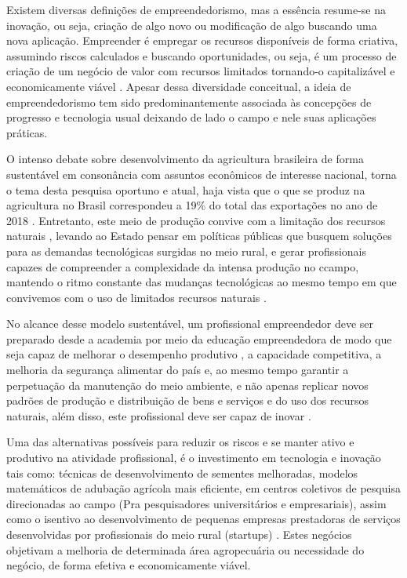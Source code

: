 Existem diversas definições de empreendedorismo, mas a essência resume-se na inovação, ou seja, criação de algo novo ou modificação de algo buscando uma nova aplicação. Empreender é empregar os recursos disponíveis de forma criativa, assumindo riscos calculados e buscando oportunidades, ou seja, é um processo de criação de um negócio de valor com recursos limitados tornando-o capitalizável e economicamente viável  \cite{costa_empreendedorismo_2006, stevenson_new_1989, lopes_educacao_2010}. Apesar dessa diversidade conceitual, a ideia de empreendedorismo tem sido predominantemente associada às concepções de progresso e tecnologia usual deixando de lado o campo e nele suas aplicações práticas.  

O intenso debate sobre desenvolvimento da agricultura brasileira de forma sustentável em consonância com assuntos econômicos de interesse nacional, torna o tema desta pesquisa oportuno e atual, haja vista que o que se produz na agricultura no Brasil correspondeu a 19\% do total das exportações no ano de 2018 \cite{mdic_comex_2019}. Entretanto, este meio de produção convive com a limitação dos recursos naturais \cite{jacobi_meio_1999}, levando ao Estado pensar em políticas públicas que busquem soluções para as demandas tecnológicas surgidas no meio rural, e gerar profissionais capazes de compreender a complexidade da intensa produção no ccampo, mantendo o ritmo constante das mudanças tecnológicas ao mesmo tempo em que convivemos com o uso de limitados recursos naturais  \cite{costa_dinamica_2016}.

No alcance desse modelo sustentável, um profissional empreendedor deve ser preparado desde a academia por meio da educação empreendedora de modo que seja capaz de melhorar o desempenho produtivo \cite{da_silva_qualidade_2017}, a capacidade competitiva, a melhoria da segurança alimentar do país \cite{hoffmann_brasil_2015} e, ao mesmo tempo garantir a perpetuação da manutenção do meio ambiente, e não apenas replicar novos padrões de produção e distribuição de bens e serviços e do uso dos recursos naturais, além disso, este profissional deve ser capaz de inovar \cite{morais_empreendedorismo_2018}.

Uma das alternativas possíveis para reduzir os riscos e se manter ativo e produtivo na atividade profissional, é o investimento em tecnologia e inovação tais como: técnicas de desenvolvimento de sementes melhoradas, modelos matemáticos de adubação agrícola mais eficiente, em centros coletivos de pesquisa direcionadas ao campo (Pra pesquisadores universitários e empresariais), assim como o isentivo ao desenvolvimento de pequenas empresas prestadoras de serviços desenvolvidas por profissionais do meio rural (startups)  \cite{bochi_dorneles_coletivos_2014, gomes_inovacao_2014}.
Estes negócios objetivam a melhoria de determinada área agropecuária \cite{junior_agtechs:_2019} ou necessidade do negócio, de forma efetiva e economicamente viável. 


